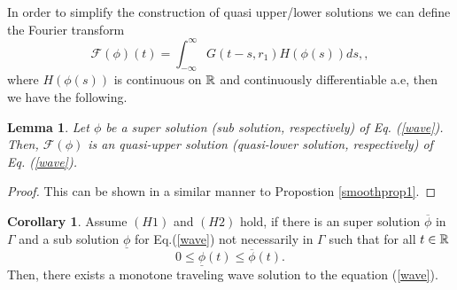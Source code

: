 \documentclass[12pt,letterpaper]{amsart}
\newtheorem{lemma}[theorem]{Lemma}
\theoremstyle{definition}
\newtheorem{corollary}[theorem]{Corollary}
\theoremstyle{remark}
\numberwithin{equation}{section}
\begin{document}
\medskip
\noindent In order to simplify the construction of quasi upper/lower solutions we can define the Fourier transform \[\mathcal{F}\left(\phi\right)(t)=\int^\infty_{-\infty} G(t-s,r_1)H(\phi(s))ds,,\] 
where $H(\phi(s))$ is continuous on $\mathbb R$ and continuously differentiable a.e, then we have the following.
\begin{lemma}
Let ${\phi}$ be a super solution (sub solution, respectively) of Eq. (\ref{wave}). Then, $\mathcal{F}(\phi)$ is an quasi-upper solution (quasi-lower solution, respectively) of Eq. 
(\ref{wave}).
\end{lemma}
\begin{proof} This can be shown in a similar manner to Propostion \ref{smoothprop1}.
\end{proof}
\begin{corollary}
Assume $(H1)$ and $ (H2)$  hold, if there is an super solution $\overline{\phi}$ in $\Gamma$ and a sub solution $\underline{\phi}$ for Eq.(\ref{wave}) not necessarily  in $\Gamma$  such that for all $t\in \mathbb R$
\[0\le  \underline{\phi}(t)\le \overline{\phi}(t).\]
Then, there exists a monotone traveling wave solution to the equation (\ref{wave}).
\end{corollary}
\end{document}
